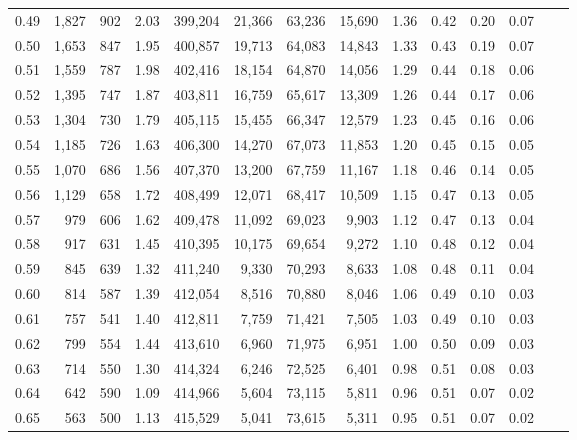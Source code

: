 \begin{tabular}{rrrrrrrrrrrrrr}
0.49 &   1,827 &    902 &    2.03 &  399,204 &   21,366 &  63,236 &  15,690 &  1.36 &  0.42 &  0.20 &      0.07 \\
0.50 &   1,653 &    847 &    1.95 &  400,857 &   19,713 &  64,083 &  14,843 &  1.33 &  0.43 &  0.19 &      0.07 \\
0.51 &   1,559 &    787 &    1.98 &  402,416 &   18,154 &  64,870 &  14,056 &  1.29 &  0.44 &  0.18 &      0.06 \\
0.52 &   1,395 &    747 &    1.87 &  403,811 &   16,759 &  65,617 &  13,309 &  1.26 &  0.44 &  0.17 &      0.06 \\
0.53 &   1,304 &    730 &    1.79 &  405,115 &   15,455 &  66,347 &  12,579 &  1.23 &  0.45 &  0.16 &      0.06 \\
0.54 &   1,185 &    726 &    1.63 &  406,300 &   14,270 &  67,073 &  11,853 &  1.20 &  0.45 &  0.15 &      0.05 \\
0.55 &   1,070 &    686 &    1.56 &  407,370 &   13,200 &  67,759 &  11,167 &  1.18 &  0.46 &  0.14 &      0.05 \\
0.56 &   1,129 &    658 &    1.72 &  408,499 &   12,071 &  68,417 &  10,509 &  1.15 &  0.47 &  0.13 &      0.05 \\
0.57 &     979 &    606 &    1.62 &  409,478 &   11,092 &  69,023 &   9,903 &  1.12 &  0.47 &  0.13 &      0.04 \\
0.58 &     917 &    631 &    1.45 &  410,395 &   10,175 &  69,654 &   9,272 &  1.10 &  0.48 &  0.12 &      0.04 \\
0.59 &     845 &    639 &    1.32 &  411,240 &    9,330 &  70,293 &   8,633 &  1.08 &  0.48 &  0.11 &      0.04 \\
0.60 &     814 &    587 &    1.39 &  412,054 &    8,516 &  70,880 &   8,046 &  1.06 &  0.49 &  0.10 &      0.03 \\
0.61 &     757 &    541 &    1.40 &  412,811 &    7,759 &  71,421 &   7,505 &  1.03 &  0.49 &  0.10 &      0.03 \\
0.62 &     799 &    554 &    1.44 &  413,610 &    6,960 &  71,975 &   6,951 &  1.00 &  0.50 &  0.09 &      0.03 \\
0.63 &     714 &    550 &    1.30 &  414,324 &    6,246 &  72,525 &   6,401 &  0.98 &  0.51 &  0.08 &      0.03 \\
0.64 &     642 &    590 &    1.09 &  414,966 &    5,604 &  73,115 &   5,811 &  0.96 &  0.51 &  0.07 &      0.02 \\
0.65 &     563 &    500 &    1.13 &  415,529 &    5,041 &  73,615 &   5,311 &  0.95 &  0.51 &  0.07 &      0.02 \\

\end{tabular}
